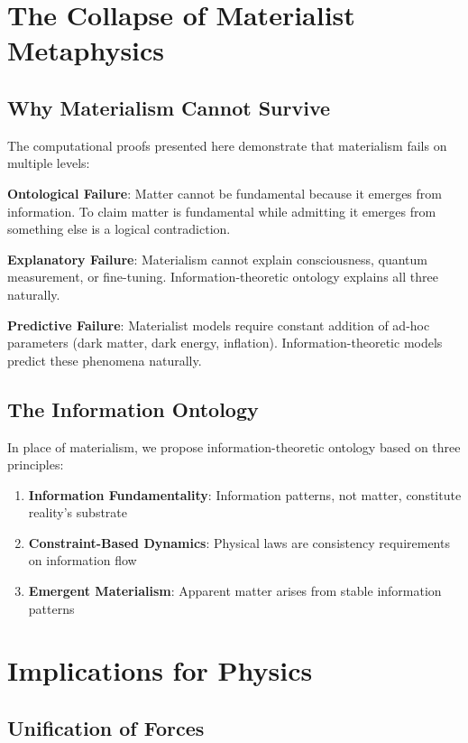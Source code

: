 \documentclass[12pt]{article}
\begin{document}
\section{The Collapse of Materialist Metaphysics}

\subsection{Why Materialism Cannot Survive}

The computational proofs presented here demonstrate that materialism fails on multiple levels:

\textbf{Ontological Failure}: Matter cannot be fundamental because it emerges from information. To claim matter is fundamental while admitting it emerges from something else is a logical contradiction.

\textbf{Explanatory Failure}: Materialism cannot explain consciousness, quantum measurement, or fine-tuning. Information-theoretic ontology explains all three naturally.

\textbf{Predictive Failure}: Materialist models require constant addition of ad-hoc parameters (dark matter, dark energy, inflation). Information-theoretic models predict these phenomena naturally.

\subsection{The Information Ontology}

In place of materialism, we propose information-theoretic ontology based on three principles:

\begin{enumerate}
\item \textbf{Information Fundamentality}: Information patterns, not matter, constitute reality's substrate
\item \textbf{Constraint-Based Dynamics}: Physical laws are consistency requirements on information flow
\item \textbf{Emergent Materialism}: Apparent matter arises from stable information patterns
\end{enumerate}

\section{Implications for Physics}

\subsection{Unification of Forces}
\end{document}

